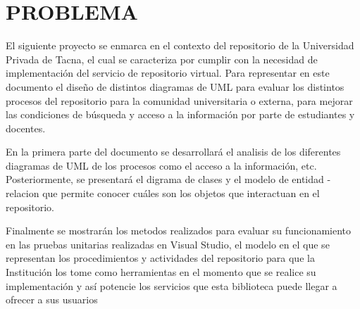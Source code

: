 \section{PROBLEMA} 
El siguiente proyecto se enmarca en el contexto del repositorio de la Universidad Privada de Tacna,
el cual se caracteriza por cumplir con la necesidad de implementación del servicio de repositorio virtual.
Para representar en este documento el diseño de distintos  diagramas de UML para evaluar los distintos procesos del repositorio para la
comunidad universitaria o externa, para mejorar
las condiciones de búsqueda y acceso a la información por parte de estudiantes y docentes.

\vspace*{0.3in}
En la primera parte del  documento se desarrollará el analisis de los diferentes diagramas de UML de los procesos 
como el acceso a la información, etc.
Posteriormente, se presentará el digrama de clases y el modelo de entidad - relacion que permite conocer cuáles son los
objetos que interactuan en el repositorio.

\vspace*{0.3in}
Finalmente se mostrarán los metodos realizados para evaluar su funcionamiento en las pruebas unitarias realizadas en Visual Studio, el modelo en el que se representan los procedimientos y
actividades del repositorio  para que la Institución los tome como herramientas en el momento que
se realice su implementación y así potencie los servicios que esta biblioteca puede
llegar a ofrecer a sus usuarios